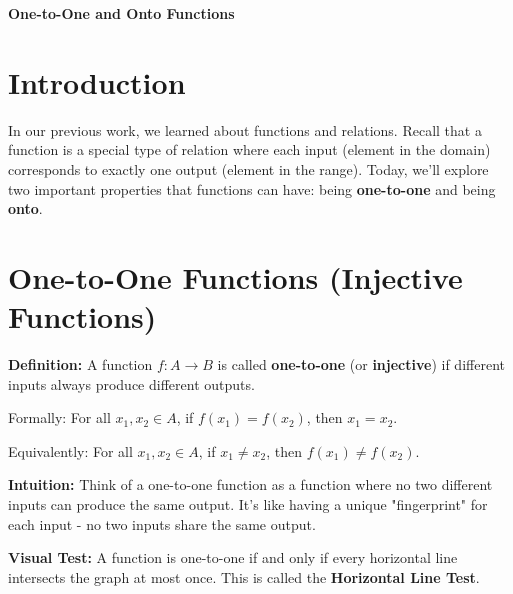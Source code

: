 \documentclass[12pt]{article}
\begin{document}
\begin{center}
\textbf{\Large One-to-One and Onto Functions} \\
\vspace{0.5cm}
\hspace{0.1\textwidth}
\end{center}

\vspace{0.5cm}

\section{Introduction}

In our previous work, we learned about functions and relations. Recall that a function is a special type of relation where each input (element in the domain) corresponds to exactly one output (element in the range). Today, we'll explore two important properties that functions can have: being \textbf{one-to-one} and being \textbf{onto}.

\section{One-to-One Functions (Injective Functions)}

\textbf{Definition:} A function $f: A \to B$ is called \textbf{one-to-one} (or \textbf{injective}) if different inputs always produce different outputs. 

Formally: For all $x_1, x_2 \in A$, if $f(x_1) = f(x_2)$, then $x_1 = x_2$.

Equivalently: For all $x_1, x_2 \in A$, if $x_1 \neq x_2$, then $f(x_1) \neq f(x_2)$.

\vspace{0.7cm}

\textbf{Intuition:} Think of a one-to-one function as a function where no two different inputs can produce the same output. It's like having a unique "fingerprint" for each input - no two inputs share the same output.

\textbf{Visual Test:} A function is one-to-one if and only if every horizontal line intersects the graph at most once. This is called the \textbf{Horizontal Line Test}.

\vspace{0.7cm}
\end{document}
